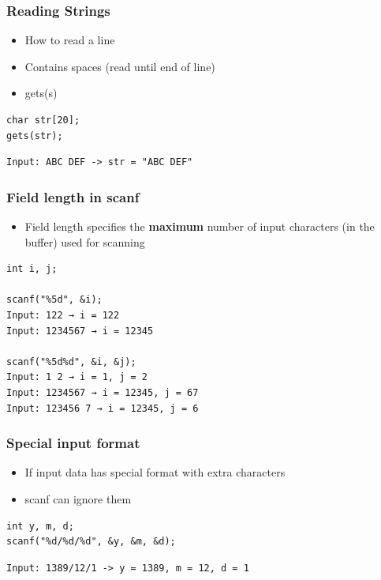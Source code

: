 \documentclass{../c-lecture}
\begin{document}
\begin{frame}[fragile]
  \frametitle{Reading Strings}
  \begin{itemize}
    \item How to read a line
    \item Contains spaces (read until end of line)
    \item gets(s)
  \end{itemize}
  \begin{verbatim}
char str[20];
gets(str);
  \end{verbatim}
  \begin{verbatim}
Input: ABC DEF -> str = "ABC DEF"
  \end{verbatim}
\end{frame}

\begin{frame}[fragile]
  \frametitle{Field length in scanf}
  \begin{itemize}
    \item
      Field length specifies the \textbf{\color{Orange} maximum} number
      of input characters (in the buffer) used for scanning

  \end{itemize}
  \begin{verbatim}
int i, j;

scanf("%5d", &i);
Input: 122 → i = 122
Input: 1234567 → i = 12345

scanf("%5d%d", &i, &j);
Input: 1 2 → i = 1, j = 2
Input: 1234567 → i = 12345, j = 67
Input: 123456 7 → i = 12345, j = 6
  \end{verbatim}
\end{frame}

\begin{frame}[fragile]
  \frametitle{Special input format}
  \begin{itemize}
    \item If input data has special format with extra characters
    \item scanf can ignore them
  \end{itemize}
  \begin{verbatim}
int y, m, d;
scanf("%d/%d/%d", &y, &m, &d);
  \end{verbatim}
  \begin{verbatim}
Input: 1389/12/1 -> y = 1389, m = 12, d = 1
  \end{verbatim}
\end{frame}
\end{document}
